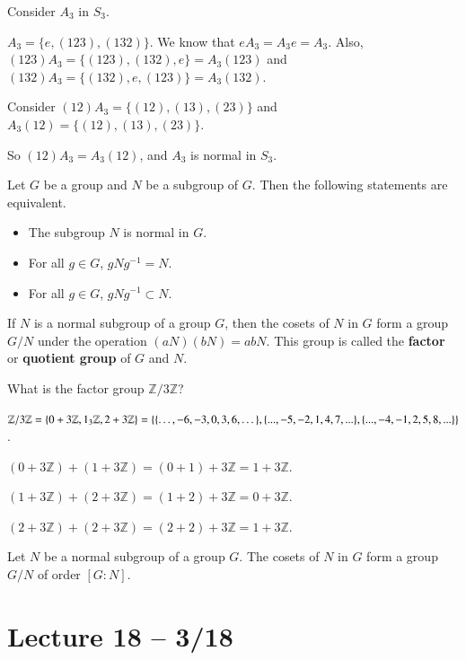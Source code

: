 \documentclass{article}
\newcommand{\Z}{\mathbb{Z}}
\begin{document}
\begin{example}
  Consider $A_3$ in $S_3$.

  $A_3=\{e, (123), (132)\}$. We know that $eA_3=A_3e=A_3$. Also, $(123)A_3=\{(123), (132), e\}=A_3(123)$ and $(132)A_3=\{(132), e, (123)\}=A_3(132)$.

  Consider $(12)A_3=\{(12), (13), (23)\}$ and $A_3(12)=\{(12), (13), (23)\}$.

  So $(12)A_3=A_3(12)$, and $A_3$ is normal in $S_3$.
\end{example}

\begin{theorem}
  Let $G$ be a group and $N$ be a subgroup of $G$. Then the following statements are equivalent.
  \begin{itemize}
    \item The subgroup $N$ is normal in $G$.
    \item For all $g\in G$, $gNg^{-1}=N$.
    \item For all $g\in G$, $gNg^{-1}\subset N$.
  \end{itemize}
\end{theorem}

\begin{definition}
  If $N$ is a normal subgroup of a group $G$, then the cosets of $N$ in $G$ form a group $G/N$ under the operation $(aN)(bN)=abN.$ This group is called the \textbf{factor} or \textbf{quotient group} of $G$ and $N$.
\end{definition}
\begin{example}
  What is the factor group $\Z/3\Z$?

  $\Z/3\Z=\{0+3\Z,1_3\Z,2+3\Z\}=\\\{\{\dots,-6,-3,0,3,6,\dots\}, \{...,-5,-2,1,4,7,...\}, \{...,-4,-1,2,5,8,...\}\}$.

  $(0+3\Z)+(1+3\Z)=(0+1)+3\Z=1+3\Z$.

  $(1+3\Z)+(2+3\Z)=(1+2)+3\Z=0+3\Z$.

  $(2+3\Z)+(2+3\Z)=(2+2)+3\Z=1+3\Z$.
\end{example}

\begin{theorem}
  Let $N$ be a normal subgroup of a group $G$. The cosets of $N$ in $G$ form a group $G/N$ of order $[G:N]$.
\end{theorem}
\section{Lecture 18 -- 3/18}
\end{document}
